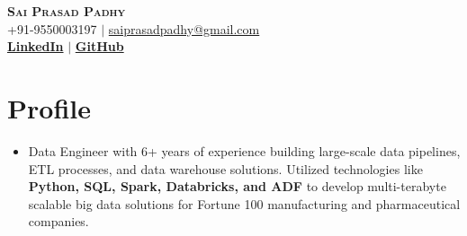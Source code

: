 \documentclass[letterpaper,11pt]{article}
\begin{document}




\begin{center}
    \textbf{\Huge \scshape Sai Prasad Padhy} \\ \vspace{1pt}
    \small +91-9550003197 $|$ \href{mailto:saiprasadpadhy@gmail.com}{{saiprasadpadhy@gmail.com}}    \\ 
    \small  
    \href{https://www.linkedin.com/in/saiprasadpadhy/}{\bf LinkedIn} $|$
    \href{https://github.com/padhysai}{\bf GitHub} 
    
\end{center}



\section{Profile}
\begin{itemize}[leftmargin=0.15in, label={}]
\item 
Data Engineer with 6+ years of experience building large-scale data pipelines, ETL processes, and data warehouse solutions. Utilized technologies like \textbf{Python, SQL, Spark, Databricks, and ADF} to develop multi-terabyte scalable big data solutions for Fortune 100 manufacturing and pharmaceutical companies.
\end{itemize}
\end{document}
